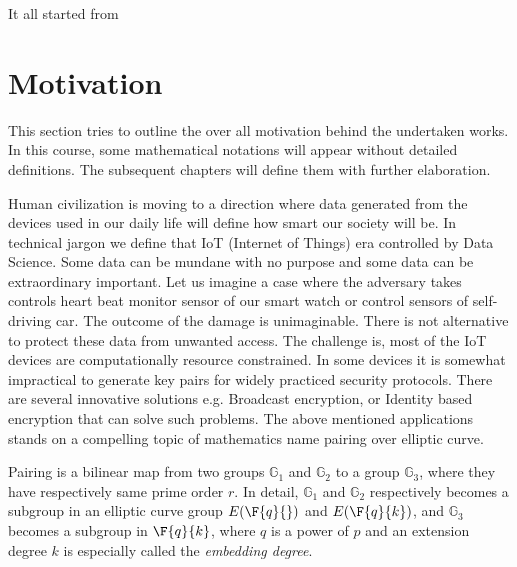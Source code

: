 


It all started from 
\section{Motivation}
\label{ch1_sec_motivation}

This section tries to outline the over all motivation behind the undertaken works.
In this course, some mathematical notations will appear without detailed definitions.
The subsequent chapters will define them with further elaboration.

Human civilization is moving to a direction where data generated from the devices used in our daily life will define how smart our society will be.
In technical jargon we define that IoT (Internet of Things) era controlled by Data Science.
Some data can be mundane with no purpose and some data can be extraordinary important.
Let us imagine a case where the adversary takes controls heart beat monitor sensor of our smart watch or control sensors of self-driving car.
The outcome of the damage is unimaginable. 
There is not alternative to protect these data from unwanted access.
The challenge is, most of the IoT devices are computationally resource constrained.
In some devices it is somewhat impractical to generate key pairs for widely practiced security protocols.
There are several innovative solutions e.g. Broadcast encryption, or Identity based encryption that can solve such problems.
The above mentioned applications stands on a compelling topic of mathematics name pairing over elliptic curve.

Pairing is a bilinear map from two groups $\mathbb{G}_1$ and $\mathbb{G}_2$ to a group $\mathbb{G}_3$, where they have respectively same prime order $r$.
In detail, $\mathbb{G}_1$ and $\mathbb{G}_2$ respectively becomes a subgroup in an elliptic curve group $E(\F{q}{})$ and $E(\F{q}{k})$, and $\mathbb{G}_3$ becomes a subgroup in $\F{q}{k}$, where $q$ is a power of $p$ and an extension degree $k$ is especially called the {\it embedding degree}.

